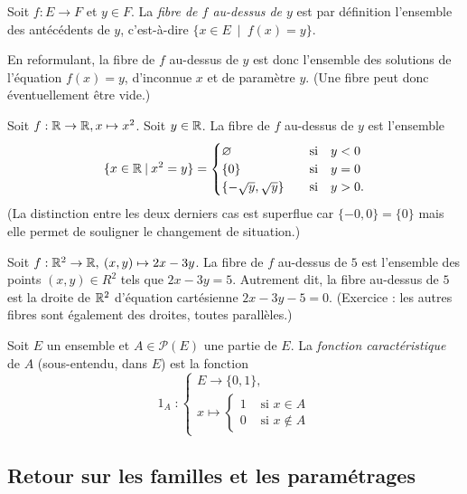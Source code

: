 \begin{definition}
Soit $f : E\to F$ et $y\in F$. La \emph{fibre de $f$ au-dessus de $y$} est par définition l'ensemble des antécédents de $y$, c'est-à-dire $\{x\in E \:\mid\: f(x)=y\}$.

En reformulant, la fibre de $f$ au-dessus de $y$ est donc l'ensemble des solutions de l'équation $f(x)=y$, d'inconnue $x$ et de paramètre $y$. (Une fibre peut donc éventuellement être vide.)
\end{definition}

\begin{exemple}
Soit $f : \mathbb{R}\to \mathbb{R}, x\mapsto x^2$. Soit $y\in \mathbb{R}$. La fibre de $f$ au-dessus de $y$ est l'ensemble 
\[
\{x\in \mathbb{R}\:|\: x^2=y\} = 
\begin{cases}
\varnothing &\quad\text{si}\quad y<0\\
\{0\} & \quad\text{si}\quad y=0\\
\{-\sqrt y, \sqrt y\}& \quad\text{si}\quad y>0.
\end{cases}
\]
(La distinction entre les deux derniers cas est superflue car $\{-0,0\}=\{0\}$ mais elle permet de souligner le changement de situation.)
\end{exemple}

\begin{exemple}
Soit $f : \mathbb{R}^2\to \mathbb{R},\: (x,y)\mapsto 2x-3y$. La fibre de $f$ au-dessus de $5$ est l'ensemble des points $(x,y) \in R^2$ tels que $2x-3y=5$. Autrement dit, la fibre au-dessus de $5$ est la droite de $\mathbb{R}^2$ d'équation cartésienne $2x-3y-5=0$. (Exercice : les autres fibres sont également des droites, toutes parallèles.)
\end{exemple}

\begin{definition}
Soit $E$ un ensemble et $A\in \mathcal P(E)$ une partie de $E$. La \emph{fonction caractéristique} de $A$ (sous-entendu, dans $E$) est la fonction 
\[
\operatorname{1}_A :\begin{cases}E \to \{0,1\},\\ x\mapsto \begin{cases}1&\text{ si } x\in A\\0&\text{ si } x\not\in A\end{cases}\end{cases}
\]
\end{definition}




\subsection{Retour sur les familles et les paramétrages}
\label{subsec-retour-parametrage-familles}

